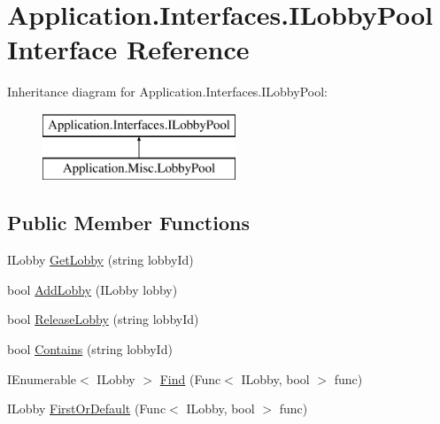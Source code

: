 \hypertarget{interface_application_1_1_interfaces_1_1_i_lobby_pool}{}\section{Application.\+Interfaces.\+I\+Lobby\+Pool Interface Reference}
\label{interface_application_1_1_interfaces_1_1_i_lobby_pool}
Inheritance diagram for Application.\+Interfaces.\+I\+Lobby\+Pool\+:\begin{figure}[H]
\begin{center}
\leavevmode
\includegraphics[height=2.000000cm]{interface_application_1_1_interfaces_1_1_i_lobby_pool}
\end{center}
\end{figure}
\subsection*{Public Member Functions}
\begin{DoxyCompactItemize}
\item 
I\+Lobby \mbox{\hyperlink{interface_application_1_1_interfaces_1_1_i_lobby_pool_a044d19c090cbd70a17de4b487fd6d613}{Get\+Lobby}} (string lobby\+Id)
\item 
bool \mbox{\hyperlink{interface_application_1_1_interfaces_1_1_i_lobby_pool_a2aa933d501630b665f67c68e39012a4c}{Add\+Lobby}} (I\+Lobby lobby)
\item 
bool \mbox{\hyperlink{interface_application_1_1_interfaces_1_1_i_lobby_pool_a61058848af185e20841421e7f52e8b94}{Release\+Lobby}} (string lobby\+Id)
\item 
bool \mbox{\hyperlink{interface_application_1_1_interfaces_1_1_i_lobby_pool_a9a09df8415ae760c99d5a6bcd1ac91f9}{Contains}} (string lobby\+Id)
\item 
I\+Enumerable$<$ I\+Lobby $>$ \mbox{\hyperlink{interface_application_1_1_interfaces_1_1_i_lobby_pool_ac64adf71b4ab967725dec520bab627c3}{Find}} (Func$<$ I\+Lobby, bool $>$ func)
\item 
I\+Lobby \mbox{\hyperlink{interface_application_1_1_interfaces_1_1_i_lobby_pool_aa518351cc8b58ef5997f7ecef19633bb}{First\+Or\+Default}} (Func$<$ I\+Lobby, bool $>$ func)
\end{DoxyCompactItemize}
